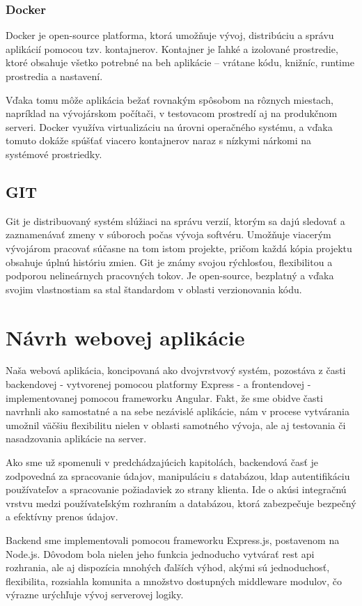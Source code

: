 \subsubsection{Docker}
Docker je open-source platforma, ktorá umožňuje vývoj, distribúciu a správu aplikácií pomocou tzv. kontajnerov. 
Kontajner je ľahké a izolované prostredie, ktoré obsahuje všetko potrebné na beh aplikácie – vrátane kódu, knižníc, runtime prostredia a nastavení.

Vďaka tomu môže aplikácia bežať rovnakým spôsobom na rôznych miestach, napríklad na vývojárskom počítači, v testovacom prostredí aj na produkčnom serveri. 
Docker využíva virtualizáciu na úrovni operačného systému, a vďaka tomuto dokáže spúšťať viacero kontajnerov naraz s nízkymi nárkomi na systémové prostriedky.\cite{docker}
\subsection{GIT}
Git je distribuovaný systém slúžiaci na správu verzií, ktorým sa dajú sledovať a zaznamenávať zmeny v súboroch počas vývoja softvéru.
 Umožňuje viacerým vývojárom pracovať súčasne na tom istom projekte, pričom každá kópia projektu obsahuje úplnú históriu zmien. 
 Git je známy svojou rýchlosťou, flexibilitou a podporou nelineárnych pracovných tokov. 
Je open-source, bezplatný a vďaka svojim vlastnostiam sa stal štandardom v oblasti verzionovania kódu.\cite{git}

\section{Návrh webovej aplikácie}
Naša webová aplikácia, koncipovaná ako dvojvrstvový systém, pozostáva z časti  backendovej - vytvorenej pomocou platformy Express - a frontendovej - implementovanej pomocou frameworku Angular.
Fakt, že sme obidve časti navrhnli ako samostatné a na sebe nezávislé aplikácie, nám v procese vytvárania umožnil väčšiu flexibilitu nielen v oblasti samotného vývoja, ale aj testovania či nasadzovania aplikácie na server.

Ako sme už spomenuli v predchádzajúcich kapitolách, backendová časť je zodpovedná za spracovanie údajov, manipuláciu s databázou, \acrshort{ldap} autentifikáciu používateľov a spracovanie požiadaviek zo strany klienta. Ide o akúsi integračnú vrstvu medzi používateľským rozhraním a databázou, ktorá zabezpečuje bezpečný a efektívny prenos údajov. 

Backend sme implementovali pomocou frameworku Express.js, postavenom na Node.js. Dôvodom bola nielen jeho funkcia jednoducho vytvárať \acrshort{rest} \acrshort{api} rozhrania, ale aj dispozícia mnohých ďalších výhod, akými sú jednoduchosť, flexibilita, rozsiahla komunita a množstvo dostupných middleware modulov, čo výrazne urýchľuje vývoj serverovej logiky.

